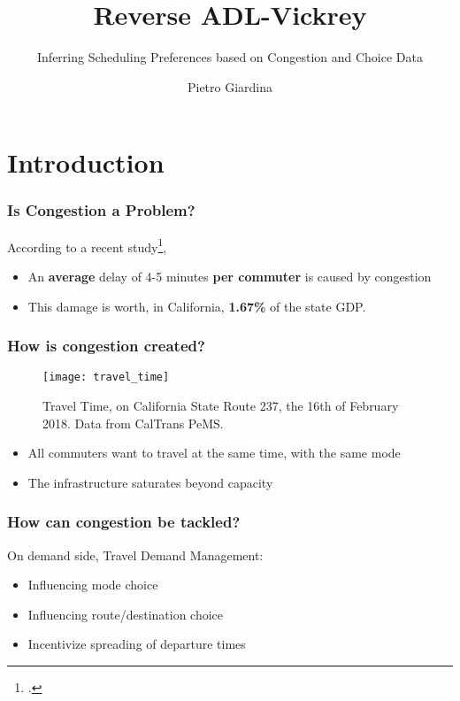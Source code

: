 \documentclass[hyperref={pdfpagelabels=false}]{beamer}
\title{Reverse ADL-Vickrey}
\subtitle{Inferring Scheduling Preferences based on Congestion and Choice Data}
\author{Pietro Giardina}
\begin{document}
\inserttitlepage


\section{Introduction} %
\begin{frame}
  \tableofcontents[currentsection]
\end{frame}

\begin{frame}
  \frametitle{Is Congestion a Problem?}
  According to a recent study\footcite{kim2022congestion},
  \begin{itemize}
  \item An \textbf{average} delay of 4-5 minutes \textbf{per commuter} is caused by congestion
  \item This damage is worth, in California, \textbf{1.67\%} of the state GDP.
  \end{itemize}
\end{frame}

\begin{frame}
  \frametitle{How is congestion created?}
  \begin{figure}
    \centering
    \texttt{[image: travel\_time]}
    \caption{Travel Time, on California State Route 237, the 16th of February 2018.
    Data from CalTrans PeMS.}
    \label{fig:tt}
  \end{figure}
  \begin{itemize}
  \item All commuters want to travel at the same time, with the same mode
  \item<2-> The infrastructure saturates beyond capacity
  \end{itemize}
\end{frame}

\begin{frame}
  \frametitle{How can congestion be tackled?}
  On demand side, Travel Demand Management:
  \begin{itemize}
  \item<2-> Influencing mode choice
  \item<3-> Influencing route/destination choice
  \item<4-> Incentivize spreading of departure times
  \end{itemize}

\end{frame}
\end{document}
